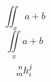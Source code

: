 \documentclass[UTF8]{ctexart}
\begin{document}
	$$\iint_{x}a+b$$
	$$\iint\limits_{x}a+b$$
	$$\prescript{n}{m}{h}_i^j$$
\end{document}
